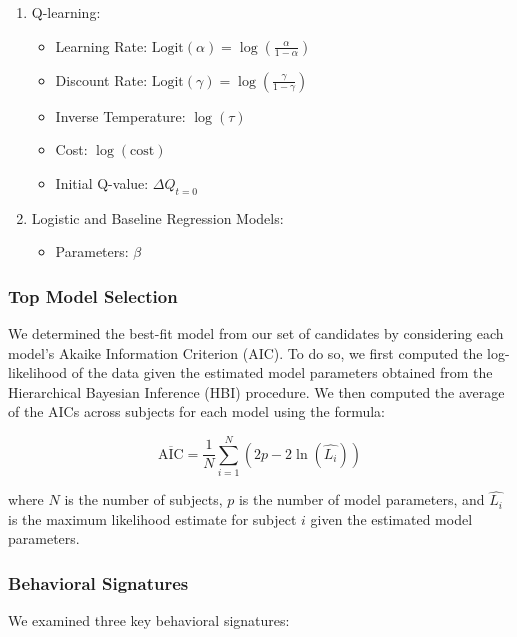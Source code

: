 \documentclass[
  number,
  preprint,
  3p,
  onecolumn]{elsarticle}
\providecommand{\tightlist}{%
  \setlength{\itemsep}{0pt}\setlength{\parskip}{0pt}}
\begin{document}
\begin{enumerate}
\def\labelenumi{\arabic{enumi}.}
\tightlist
\item
  Q-learning:

  \begin{itemize}
  \tightlist
  \item
    Learning Rate:
    \(\text{Logit}(\alpha)=\log(\frac{\alpha}{1-\alpha})\)
  \item
    Discount Rate:
    \(\text{Logit}(\gamma)=\log(\frac{\gamma}{1-\gamma})\)
  \item
    Inverse Temperature: \(\log(\tau)\)
  \item
    Cost: \(\log(\text{cost})\)
  \item
    Initial Q-value: \(\Delta Q_{t=0}\)
  \end{itemize}
\item
  Logistic and Baseline Regression Models:

  \begin{itemize}
  \tightlist
  \item
    Parameters: \(\beta\)
  \end{itemize}
\end{enumerate}

\subsubsection{Top Model Selection}\label{top-model-selection-1}

We determined the best-fit model from our set of candidates by
considering each model's Akaike Information Criterion (AIC). To do so,
we first computed the log-likelihood of the data given the estimated
model parameters obtained from the Hierarchical Bayesian Inference (HBI)
procedure. We then computed the average of the AICs across subjects for
each model using the formula:

\[
\overline{\text{AIC}} = \frac{1}{N} \sum_{i=1}^{N} \left( 2p - 2\ln(\hat{L_i}) \right)
\]

where \(N\) is the number of subjects, \(p\) is the number of model
parameters, and \(\hat{L_i}\) is the maximum likelihood estimate for
subject \(i\) given the estimated model parameters.

\subsubsection{Behavioral Signatures}\label{behavioral-signatures}

We examined three key behavioral signatures:
\end{document}

